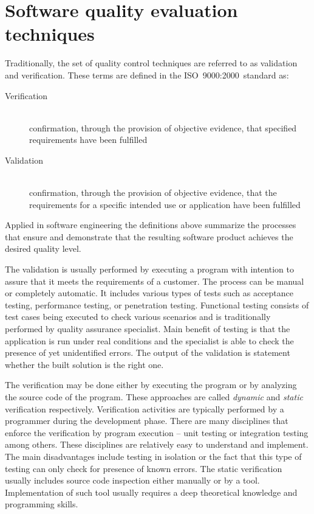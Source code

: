 \documentclass[12pt,final,oneside]{fithesis2}
\theoremstyle{definition}
\begin{document}
\section{Software quality evaluation techniques}
\label{sec:softwarequality}

Traditionally, the set of quality control techniques are referred to as
validation and verification. These terms are defined in the
ISO~9000:2000~standard \cite{iso9000-2000} as:

\begin{description}

\item[Verification] \hfill \\
confirmation, through the provision of objective evidence, that specified
requirements have been fulfilled

\item[Validation] \hfill \\
confirmation, through the provision of objective evidence, that the requirements
for a specific intended use or application have been fulfilled

\end{description}

Applied in software engineering the definitions above summarize the
processes that ensure and demonstrate that the resulting software product
achieves the desired quality level.

The validation is usually performed by executing a program with intention
to assure that it meets the requirements of a customer.
The process can be manual or completely automatic. It includes
various types of tests such as acceptance testing, performance testing,
or penetration testing. Functional testing consists of test cases
being executed to check various scenarios and is traditionally performed
by quality assurance specialist. Main benefit of testing is that the
application is run under real conditions and the specialist is able to
check the presence of yet unidentified errors. The output of the validation
is statement whether the built solution is the right one.

The verification may be done either by executing the program or by
analyzing the source code of the program. These approaches are called
\textit{dynamic} and \textit{static} verification respectively. Verification activities
are typically performed by a programmer during the development phase.
There are many disciplines that enforce the verification by program
execution -- unit testing or integration testing among others. These
disciplines are relatively easy to understand and implement. The main
disadvantages include testing in isolation or the fact that this type of
testing can only check for presence of known errors. The static
verification usually includes source code inspection either manually or
by a tool. Implementation of such tool usually requires a deep
theoretical knowledge and programming skills.
\end{document}
